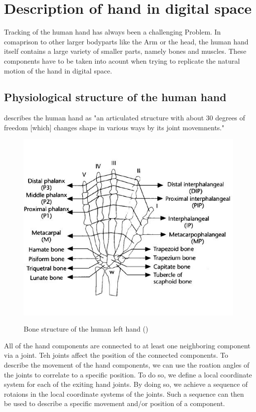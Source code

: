 \chapter{Description of hand in digital space}
Tracking of the human hand has always been a challenging Problem. In comaprison to other larger bodyparts like the Arm or the head, the human hand itself contains a large variety of smaller parts, namely bones and muscles. These components have to be taken into acount when trying to replicate the natural motion of the hand in digital space.\\
\section{Physiological structure of the human hand}
\citep{LEE.1995} describes the human hand as "an articulated structure with about 30 degrees of freedom [which] changes shape in various ways by its joint movemnents."
\begin{figure}[H]
	\includegraphics[scale=0.8]{images/hand.jpg}
	\label{Handstructure} 
	\caption{Bone structure of the human left hand (\cite{LEE.1995})}
\end{figure}
All of the hand components are connected to at least one neighboring component via a joint. Teh joints affect the position of the connected components. To describe the movement of the hand components, we can use the roation angles of the joints to correlate to a specific position.
To do so, we define a local coordinate system for each of the exiting hand joints. By doing so, we achieve a sequence of rotaions in the local coordinate systems of the joints. Such a sequence can then be used to describe a specific movement and/or position of a component.
